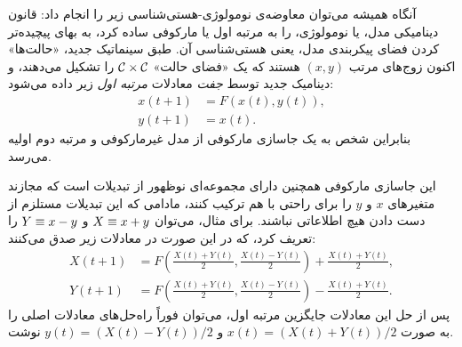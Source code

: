 \documentclass{article}
\begin{document}
آنگاه همیشه می‌توان معاوضه‌ی نومولوژی-هستی‌شناسی زیر را انجام داد: قانون دینامیکی مدل، یا نومولوژی، را به مرتبه اول یا مارکوفی ساده کرد، به بهای پیچیده‌تر کردن فضای پیکربندی مدل، یعنی هستی‌شناسی آن. طبق سینماتیک جدید، «حالت‌ها» اکنون زوج‌های مرتب $\left(x,y\right)$ هستند که یک «فضای حالت» $\mathcal{C}\times\mathcal{C}$ را تشکیل می‌دهند، و دینامیک جدید توسط \emph{جفت} معادلات \emph{مرتبه اول} زیر داده می‌شود:
\begin{equation}
\begin{aligned}x\left(t+1\right) & =F\left(x\left(t\right),y\left(t\right)\right),\\
y\left(t+1\right) & =x\left(t\right).
\end{aligned}
\label{eq:FirstOrderMarkovianEmbeddingDiscrete}
\end{equation}
 بنابراین شخص به یک جاسازی مارکوفی از مدل غیرمارکوفی و مرتبه دوم اولیه می‌رسد.

این جاسازی مارکوفی همچنین دارای مجموعه‌ای نوظهور از تبدیلات است که مجازند متغیرهای $x$ و $y$ را برای راحتی با هم ترکیب کنند، مادامی که این تبدیلات مستلزم از دست دادن هیچ اطلاعاتی نباشند. برای مثال، می‌توان $X\equiv x+y$ و $Y\equiv x-y$ را تعریف کرد، که در این صورت در معادلات زیر صدق می‌کنند:
\begin{align}
X\left(t+1\right) & =F\left(\frac{X\left(t\right)+Y\left(t\right)}{2},\frac{X\left(t\right)-Y\left(t\right)}{2}\right)+\frac{X\left(t\right)+Y\left(t\right)}{2},\label{eq:FirstOrderMarkovianEmbeddingDiscreteAltVariables}\\
Y\left(t+1\right) & =F\left(\frac{X\left(t\right)+Y\left(t\right)}{2},\frac{X\left(t\right)-Y\left(t\right)}{2}\right)-\frac{X\left(t\right)+Y\left(t\right)}{2}.\nonumber 
\end{align}
 پس از حل این معادلات جایگزین مرتبه اول، می‌توان فوراً راه‌حل‌های معادلات اصلی را به صورت $x\left(t\right)=\left(X\left(t\right)+Y\left(t\right)\right)/2$ و $y\left(t\right)=\left(X\left(t\right)-Y\left(t\right)\right)/2$ نوشت.
\end{document}
